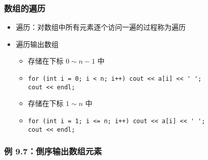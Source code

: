 \begin{frame}[fragile]
    \frametitle{数组的遍历}

    \begin{overlayarea}{\textwidth}{.55\textheight}
        \begin{itemize}
            \item 遍历：对数组中所有元素逐个访问一遍的过程称为遍历

            \item 遍历输出数组

                \begin{itemize}
                    \item<1-> 存储在下标 $0 \sim n - 1$ 中
                    \item<1-> \lstinline|for (int i = 0; i < n; i++) cout << a[i] << ' ';|\\
                        \lstinline|cout << endl;|
                    \item<2-> 存储在下标 $1 \sim n$ 中
                    \item<2-> \lstinline|for (int i = 1; i <= n; i++) cout << a[i] << ' ';|\\
                        \lstinline|cout << endl;|
                \end{itemize}

        \end{itemize}
    \end{overlayarea}
\end{frame}

\begin{frame}[fragile]
    \frametitle{例 9.7：倒序输出数组元素}

\end{frame}

